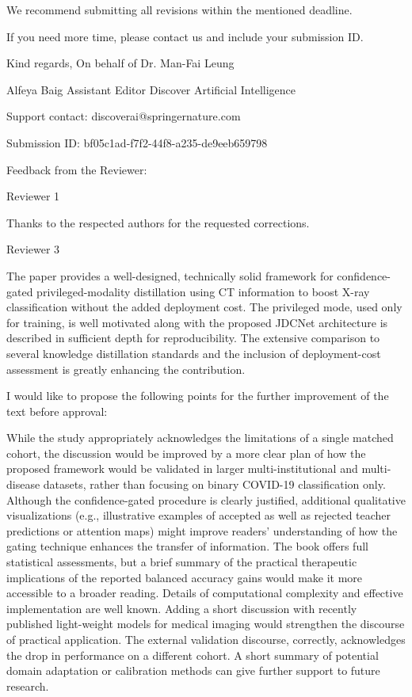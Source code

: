 {We recommend submitting all revisions within the mentioned deadline.

If you need more time, please contact us and include your submission ID.

Kind regards,
On behalf of Dr. Man-Fai Leung

Alfeya Baig
Assistant Editor
Discover Artificial Intelligence

Support contact: discoverai@springernature.com

Submission ID: bf05c1ad-f7f2-44f8-a235-de9eeb659798

Feedback from the Reviewer:

Reviewer 1

Thanks to the respected authors for the requested corrections.

Reviewer 3

The paper provides a well-designed, technically solid framework for confidence-gated privileged-modality distillation using CT information to boost X-ray classification without the added deployment cost. The privileged mode, used only for training, is well motivated along with the proposed JDCNet architecture is described in sufficient depth for reproducibility. The extensive comparison to several knowledge distillation standards and the inclusion of deployment-cost assessment is greatly enhancing the contribution.

I would like to propose the following points for the further improvement of the text before approval:

While the study appropriately acknowledges the limitations of a single matched cohort, the discussion would be improved by a more clear plan of how the proposed framework would be validated in larger multi-institutional and multi-disease datasets, rather than focusing on binary COVID-19 classification only.
Although the confidence-gated procedure is clearly justified, additional qualitative visualizations (e.g., illustrative examples of accepted as well as rejected teacher predictions or attention maps) might improve readers' understanding of how the gating technique enhances the transfer of information.
The book offers full statistical assessments, but a brief summary of the practical therapeutic implications of the reported balanced accuracy gains would make it more accessible to a broader reading.
Details of computational complexity and effective implementation are well known. Adding a short discussion with recently published light-weight models for medical imaging would strengthen the discourse of practical application.
The external validation discourse, correctly, acknowledges the drop in performance on a different cohort. A short summary of potential domain adaptation or calibration methods can give further support to future research.

}

